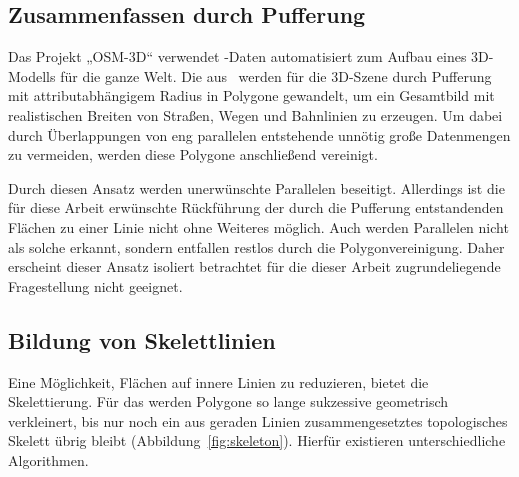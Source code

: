 \documentclass[../main/thesis.tex]{subfiles}
\begin{document}
\subsection{Zusammenfassen durch Pufferung}
\label{ch:buffer}

Das Projekt „OSM-3D“ verwendet \osm-Daten automatisiert zum Aufbau eines 3D-Modells für die ganze Welt.
Die  aus \osm\ werden für die 3D-Szene durch Pufferung mit attributabhängigem Radius in Polygone gewandelt, um ein Gesamtbild mit realistischen Breiten von Straßen, Wegen und Bahnlinien zu erzeugen.
Um dabei durch Überlappungen von eng parallelen  entstehende unnötig große Datenmengen zu vermeiden, werden diese Polygone anschließend vereinigt. 

Durch diesen Ansatz werden unerwünschte Parallelen beseitigt.
Allerdings ist die für diese Arbeit erwünschte Rückführung der durch die Pufferung entstandenden Flächen zu einer Linie nicht ohne Weiteres möglich.
Auch werden Parallelen nicht als solche erkannt, sondern entfallen restlos durch die Polygonvereinigung.
Daher erscheint dieser Ansatz isoliert betrachtet für die dieser Arbeit zugrundeliegende Fragestellung nicht geeignet.


\subsection{Bildung von Skelettlinien}
\label{ch:skeleton}

Eine Möglichkeit, Flächen auf innere Linien zu reduzieren, bietet die Skelettierung.
Für das  werden Polygone so lange sukzessive geometrisch verkleinert, bis nur noch ein aus geraden Linien zusammengesetztes topologisches Skelett übrig bleibt (Abbildung~\ref{fig:skeleton}).
Hierfür existieren unterschiedliche Algorithmen. 
\end{document}
